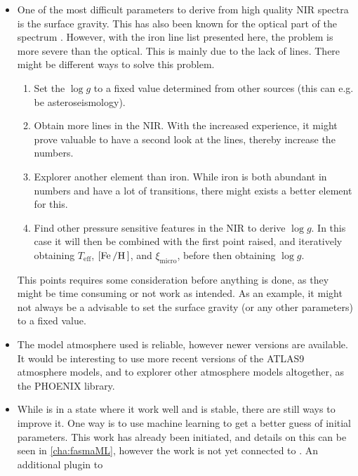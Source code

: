 \begin{itemize}
  \item One of the most difficult parameters to derive from high quality NIR spectra is the surface
        gravity. This has also been known for the optical part of the spectrum
        \citep[see e.g.][]{Mortier2014}. However, with the iron line list presented here, the
        problem is more severe than the optical. This is mainly due to the lack of 
        lines. There might be different ways to solve this problem.
        \begin{enumerate}
          \item Set the $\log g$ to a fixed value determined from other sources (this can e.g. be
                asteroseismology).
          \item Obtain more  lines in the NIR. With the increased experience, it might
                prove valuable to have a second look at the  lines, thereby increase the
                numbers.
          \item Explorer another element than iron. While iron is both abundant in numbers and have
                a lot of transitions, there might exists a better element for this.
          \item Find other pressure sensitive features in the NIR to derive $\log g$. In this case
                it will then be combined with the first point raised, and iteratively obtaining
                $T_\mathrm{eff}$, $[\ion{Fe}/\ion{H}]$, and $\xi_\mathrm{micro}$, before then
                obtaining $\log g$.
        \end{enumerate}
        This points requires some consideration before anything is done, as they might be time
        consuming or not work as intended. As an example, it might not always be a advisable to
        set the surface gravity (or any other parameters) to a fixed value.
  \item The model atmosphere used is reliable, however newer versions are available. It would be
        interesting to use more recent versions of the ATLAS9 atmosphere models, and to explorer
        other atmosphere models altogether, as the PHOENIX library.
  \item While  is in a state where it work well and is stable, there are still ways to
        improve it. One way is to use machine learning to get a better guess of initial parameters.
        This work has already been initiated, and details on this can be seen in \cref{cha:fasmaML},
        however the work is not yet connected to . An additional plugin to 

\end{itemize}
